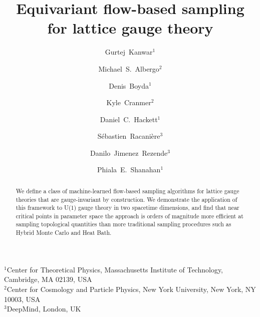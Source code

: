 \documentclass[11pt]{article}
\begin{document}
\title{\bfseries Equivariant flow-based sampling for lattice gauge theory}
\author{Gurtej~Kanwar$^{1}$ \and Michael~S.~Albergo$^{2}$ \and Denis~Boyda$^{1}$ \and Kyle~Cranmer$^{2}$ \and
Daniel~C.~Hackett$^{1}$ \and S\'{e}bastien~Racani\`{e}re$^{3}$ \and Danilo~Jimenez~Rezende$^{3}$ \and Phiala~E.~Shanahan$^{1}$}
\date{}
\maketitle
\begin{center}\small
$^{1}$Center for Theoretical Physics, Massachusetts Institute of Technology, Cambridge, MA 02139, USA\\[1pt]
$^{2}$Center for Cosmology and Particle Physics, New York University, New York, NY 10003, USA\\[1pt]
$^{3}$DeepMind, London, UK
\end{center}

\begin{abstract}
We define a class of machine-learned flow-based sampling algorithms for lattice gauge theories that are gauge-invariant by construction. We demonstrate the application of this framework to U(1) gauge theory in two spacetime dimensions, and find that near critical points in parameter space the approach is orders of magnitude more efficient at sampling topological quantities than more traditional sampling procedures such as Hybrid Monte Carlo and Heat Bath.
\end{abstract}








\end{document}
